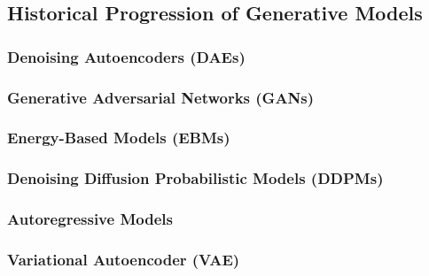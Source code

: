 \subsection{Historical Progression of Generative Models}
\label{subsec:history}
\subsubsection{Denoising Autoencoders (DAEs)}

\subsubsection{Generative Adversarial Networks (GANs)}

\subsubsection{Energy-Based Models (EBMs)}

\subsubsection{Denoising Diffusion Probabilistic Models (DDPMs)}

\subsubsection{Autoregressive Models}

\subsubsection{Variational Autoencoder (VAE)}
\label{subsubsec:auto-gan-vae}
